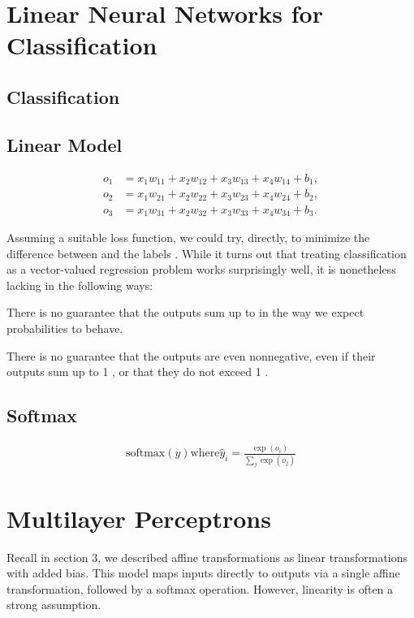 \documentclass[a4paper,12pt]{article}
\theoremstyle{definition}
\begin{document}
\section{Linear Neural Networks for Classification}
    \subsection*{Classification}

    \subsection*{Linear Model}
    \begin{equation*}
        \begin{aligned}
        o_1 &= x_1 w_{11} + x_2 w_{12} + x_3 w_{13} + x_4 w_{14} + b_1,\\
        o_2 &= x_1 w_{21} + x_2 w_{22} + x_3 w_{23} + x_4 w_{24} + b_2,\\
        o_3 &= x_1 w_{31} + x_2 w_{32} + x_3 w_{33} + x_4 w_{34} + b_3.
        \end{aligned}
    \end{equation*}


    Assuming a suitable loss function, we could try, directly, to minimize the difference between 
 and the labels 
. While it turns out that treating classification as a vector-valued regression problem works surprisingly well, it is nonetheless lacking in the following ways:

There is no guarantee that the outputs 
 sum up to 
 in the way we expect probabilities to behave.

There is no guarantee that the outputs 
 are even nonnegative, even if their outputs sum up to 1
, or that they do not exceed 1
.
    \subsection*{Softmax}
    \begin{equation*}
        \begin{aligned}
            \textrm{softmax}(y) \textrm{where} \hat{y}_i = \frac{\exp(o_i)}{\sum_{j}\exp(o_j)}
        \end{aligned}
    \end{equation*}
    
\section{Multilayer Perceptrons}
Recall in section 3, we described affine transformations as linear transformations with added bias. This model maps inputs directly to
outputs via a single affine transformation, followed by a softmax operation. However, linearity is often a strong assumption.
\end{document}

